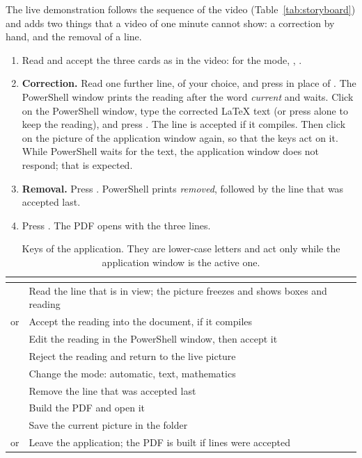 \label{st:demo}
The live demonstration follows the sequence of the video (Table~\ref{tab:storyboard}) and adds
two things that a video of one minute cannot show: a correction by hand, and the removal of a
line.
\begin{enumerate}
\item Read and accept the three cards as in the video:  for the mode, ,
  .
\item \textbf{Correction.} Read one further line, of your choice, and press  in place of
  . The PowerShell window prints the reading after the word \emph{current} and waits.
  Click on the PowerShell window, type the corrected \LaTeX{} text (or press  alone
  to keep the reading), and press . The line is accepted if it compiles. Then click
  on the picture of the application window again, so that the keys act on it. While PowerShell
  waits for the text, the application window does not respond; that is expected.
\item \textbf{Removal.} Press . PowerShell prints \emph{removed}, followed by the line
  that was accepted last.
\item Press . The PDF opens with the three lines.
\end{enumerate}

\begin{table}[H]
\centering
\begin{tabular}{C{2.2cm}L{8.8cm}}
\toprule
{} &  \\
\midrule
{} & Read the line that is in view; the picture freezes and shows boxes and reading \\
 or  & Accept the reading into the document, if it compiles \\
 & Edit the reading in the PowerShell window, then accept it \\
 & Reject the reading and return to the live picture \\
 & Change the mode: automatic, text, mathematics \\
 & Remove the line that was accepted last \\
 & Build the PDF and open it \\
 & Save the current picture in the folder  \\
 or  & Leave the application; the PDF is built if lines were accepted \\
\bottomrule
\end{tabular}
\caption{Keys of the application. They are lower-case letters and act only while the
application window is the active one.}
\label{tab:appkeys}
\end{table}

